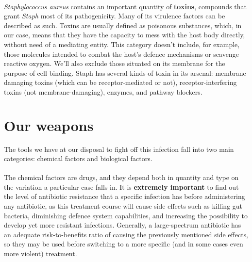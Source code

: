 \paragraph{}\emph{Staphylococcus aureus} contains an important quantity of \textbf{toxins}, compounds that grant \emph{Staph} most of its pathogenicity. Many of its virulence factors can be described as such. Toxins are usually defined as poisonous substances, which, in our case, means that they have the capacity to mess with the host body directly, without need of a mediating entity. This category doesn't include, for example, those molecules intended to combat the host's defence mechanisms or scavenge reactive oxygen. We'll also exclude those situated on its membrane for the purpose of cell binding. Staph has several kinds of toxin in its arsenal: membrane-damaging toxins (which can be receptor-mediated or not), receptor-interfering toxins (not membrane-damaging), enzymes, and pathway blockers.\newline
\section{Our weapons}
\paragraph{} The tools we have at our disposal to fight off this infection fall into two main categories: chemical factors and biological factors.
\paragraph{} The chemical factors are drugs, and they depend both in quantity and type on the variation a particular case falls in. It is \textbf{extremely important} to find out the level of antibiotic resistance that a specific infection has before administering any antibiotic, as this treatment course will cause side effects such as killing gut bacteria, diminishing defence system capabilities, and increasing the possibility to develop yet more resistant infections. Generally, a large-spectrum antibiotic has an adequate risk-to-benefits ratio of causing the previously mentioned side effects, so they may be used before switching to a more specific (and in some cases even more violent) treatment.
